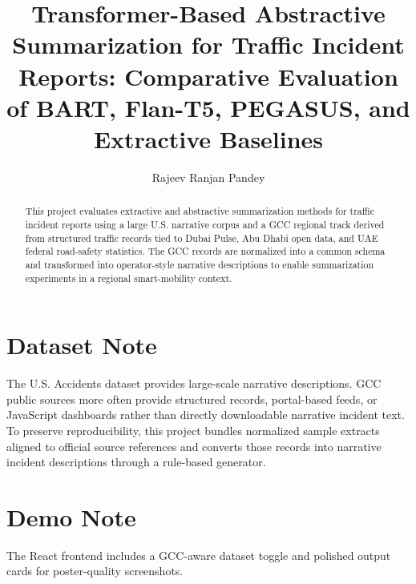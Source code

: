 \documentclass[conference]{IEEEtran}
\begin{document}
\title{Transformer-Based Abstractive Summarization for Traffic Incident Reports: Comparative Evaluation of BART, Flan-T5, PEGASUS, and Extractive Baselines}
\author{Rajeev Ranjan Pandey}
\maketitle
\begin{abstract}
This project evaluates extractive and abstractive summarization methods for traffic incident reports using a large U.S. narrative corpus and a GCC regional track derived from structured traffic records tied to Dubai Pulse, Abu Dhabi open data, and UAE federal road-safety statistics. The GCC records are normalized into a common schema and transformed into operator-style narrative descriptions to enable summarization experiments in a regional smart-mobility context.\end{abstract}
\section{Dataset Note}
The U.S. Accidents dataset provides large-scale narrative descriptions. GCC public sources more often provide structured records, portal-based feeds, or JavaScript dashboards rather than directly downloadable narrative incident text. To preserve reproducibility, this project bundles normalized sample extracts aligned to official source references and converts those records into narrative incident descriptions through a rule-based generator.
\section{Demo Note}
The React frontend includes a GCC-aware dataset toggle and polished output cards for poster-quality screenshots.


\end{document}
